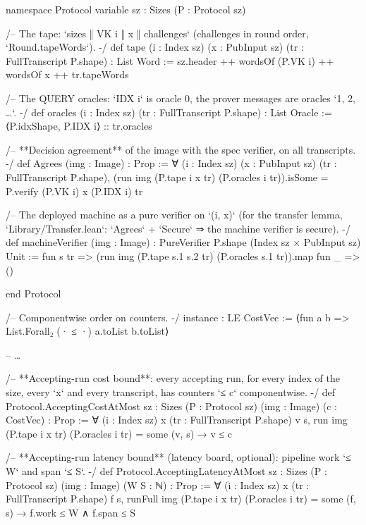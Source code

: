 \begin{leancode}[fontsize=\footnotesize,label={\footnotesize Contract/Agrees.lean (abridged)}]
namespace Protocol
variable {sz : Sizes} (P : Protocol sz)

/-- The tape: `sizes ‖ VK i ‖ x ‖ challenges` (challenges in round order, `Round.tapeWords`). -/
def tape (i : Index sz) (x : PubInput sz) (tr : FullTranscript P.shape) : List Word :=
  sz.header ++ wordsOf (P.VK i) ++ wordsOf x ++ tr.tapeWords

/-- The QUERY oracles: `IDX i` is oracle 0, the prover messages are oracles `1, 2, …`. -/
def oracles (i : Index sz) (tr : FullTranscript P.shape) : List Oracle :=
  ⟨P.idxShape, P.IDX i⟩ :: tr.oracles

/-- **Decision agreement** of the image with the spec verifier, on all transcripts. -/
def Agrees (img : Image) : Prop :=
  ∀ (i : Index sz) (x : PubInput sz) (tr : FullTranscript P.shape),
    (run img (P.tape i x tr) (P.oracles i tr)).isSome = P.verify (P.VK i) x (P.IDX i) tr

/-- The deployed machine as a pure verifier on `(i, x)` (for the transfer lemma,
`Library/Transfer.lean`: `Agrees` + `Secure` ⇒ the machine verifier is secure). -/
def machineVerifier (img : Image) : PureVerifier P.shape (Index sz × PubInput sz) Unit :=
  fun s tr => (run img (P.tape s.1 s.2 tr) (P.oracles s.1 tr)).map fun _ => ()

end Protocol
\end{leancode}
\begin{leancode}[fontsize=\footnotesize,label={\footnotesize Contract/Cost.lean (abridged)}]
/-- Componentwise order on counters. -/
instance : LE CostVec := ⟨fun a b => List.Forall₂ (· ≤ ·) a.toList b.toList⟩

-- …

/-- **Accepting-run cost bound**: every accepting run, for every index of the size, every `x`
and every transcript, has counters `≤ c` componentwise. -/
def Protocol.AcceptingCostAtMost {sz : Sizes} (P : Protocol sz) (img : Image) (c : CostVec) : Prop
    :=
  ∀ (i : Index sz) x (tr : FullTranscript P.shape) v s,
      run img (P.tape i x tr) (P.oracles i tr) = some (v, s) → v ≤ c

/-- **Accepting-run latency bound** (latency board,
    optional): pipeline work `≤ W` and span `≤ S`. -/
def Protocol.AcceptingLatencyAtMost {sz : Sizes} (P : Protocol sz) (img : Image) (W S : ℕ) : Prop
    :=
  ∀ (i : Index sz) x (tr : FullTranscript P.shape) f s,
    runFull img (P.tape i x tr) (P.oracles i tr) = some (f, s) → f.work ≤ W ∧ f.span ≤ S
\end{leancode}


